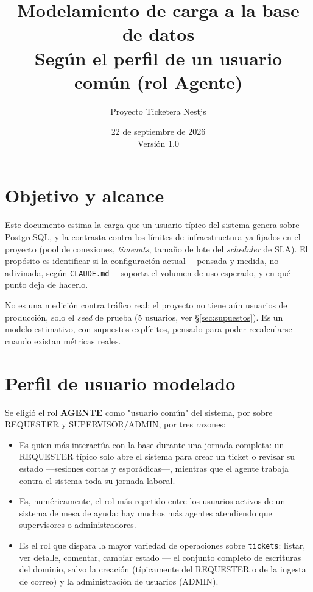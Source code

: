 \documentclass[11pt,a4paper]{article}
\title{\color{pantone186}\textbf{Modelamiento de carga a la base de datos}\\[0.3em]
\Large Según el perfil de un usuario común (rol Agente)}
\author{Proyecto Ticketera Nestjs}
\date{22 de septiembre de 2026 \\ Versión 1.0}
\begin{document}
\maketitle
\thispagestyle{empty}
\newpage
\tableofcontents
\newpage

\section{Objetivo y alcance}

Este documento estima la carga que un usuario típico del sistema genera
sobre PostgreSQL, y la contrasta contra los límites de infraestructura ya
fijados en el proyecto (pool de conexiones, \emph{timeouts}, tamaño de lote
del \emph{scheduler} de SLA). El propósito es identificar si la
configuración actual —pensada y medida, no adivinada, según
\texttt{CLAUDE.md}— soporta el volumen de uso esperado, y en qué punto deja
de hacerlo.

No es una medición contra tráfico real: el proyecto no tiene aún usuarios
de producción, solo el \emph{seed} de prueba (5 usuarios, ver
\S\ref{sec:supuestos}). Es un modelo estimativo, con supuestos explícitos,
pensado para poder recalcularse cuando existan métricas reales.

\section{Perfil de usuario modelado}

Se eligió el rol \textbf{AGENTE} como "usuario común" del sistema, por
sobre REQUESTER y SUPERVISOR/ADMIN, por tres razones:

\begin{itemize}[leftmargin=1.2cm]
  \item Es quien más interactúa con la base durante una jornada completa:
    un REQUESTER típico solo abre el sistema para crear un ticket o
    revisar su estado —sesiones cortas y esporádicas—, mientras que el
    agente trabaja contra el sistema toda su jornada laboral.
  \item Es, numéricamente, el rol más repetido entre los usuarios activos
    de un sistema de mesa de ayuda: hay muchos más agentes atendiendo que
    supervisores o administradores.
  \item Es el rol que dispara la mayor variedad de operaciones sobre
    \texttt{tickets}: listar, ver detalle, comentar, cambiar estado — el
    conjunto completo de escrituras del dominio, salvo la creación
    (típicamente del REQUESTER o de la ingesta de correo) y la
    administración de usuarios (ADMIN).
\end{itemize}
\end{document}
